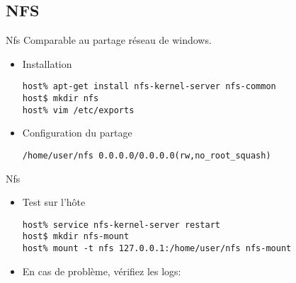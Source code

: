 \subsection{NFS}

\begin{frame}[fragile=singleslide]{Nfs}
  Comparable au partage réseau de windows.
  \begin{itemize}
  \item Installation
    \begin{lstlisting}
host% apt-get install nfs-kernel-server nfs-common
host$ mkdir nfs
host% vim /etc/exports
    \end{lstlisting} %
  \item Configuration du partage
    \begin{lstlisting}
/home/user/nfs 0.0.0.0/0.0.0.0(rw,no_root_squash)
    \end{lstlisting}
  \end{itemize}
\end{frame}

\begin{frame}[fragile=singleslide]{Nfs}
  \begin{itemize}
    \item Test sur l'hôte
      \begin{lstlisting}
host% service nfs-kernel-server restart
host$ mkdir nfs-mount
host% mount -t nfs 127.0.0.1:/home/user/nfs nfs-mount
      \end{lstlisting} %
     \item En cas de problème, vérifiez les logs: 
   \end{itemize}
\end{frame}  

